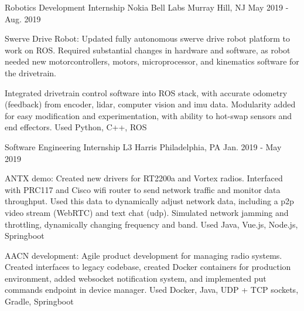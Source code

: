 \begin{cventries}
  \cventry
  {Robotics Development Internship} %
  {Nokia Bell Labs} %
  {Murray Hill, NJ} %
  {May 2019 - Aug. 2019} %
  {
    \begin{cvitems} %
      \item {Swerve Drive Robot: Updated fully autonomous swerve drive robot platform to work on ROS. Required substantial changes in hardware and software, as robot needed new motorcontrollers, motors, microprocessor, and kinematics software for the drivetrain.}
      \item {Integrated drivetrain control software into ROS stack, with accurate odometry (feedback) from encoder, lidar, computer vision and imu data. Modularity added for easy modification and experimentation, with ability to hot-swap sensors and end effectors. Used Python, C++, ROS}
    \end{cvitems}
  }

  \cventry
  {Software Engineering Internship} %
  {L3 Harris} %
  {Philadelphia, PA} %
  {Jan. 2019 - May 2019} %
  {
    \begin{cvitems} %
      \item {ANTX demo: Created new drivers for RT2200a and Vortex radios. Interfaced  with PRC117 and Cisco wifi router to send network traffic and monitor data throughput. Used this data to dynamically adjust network data, including a p2p video stream (WebRTC) and text chat (udp). Simulated network jamming and throttling, dynamically changing frequency and band. Used Java, Vue.js, Node.js, Springboot}
      \item {AACN development: Agile product development for managing radio systems. Created interfaces to legacy codebase, created Docker containers for production environment, added websocket notification system, and implemented put commands endpoint in device manager. Used Docker, Java, UDP + TCP sockets, Gradle, Springboot}
    \end{cvitems}
  }


\end{cventries}
